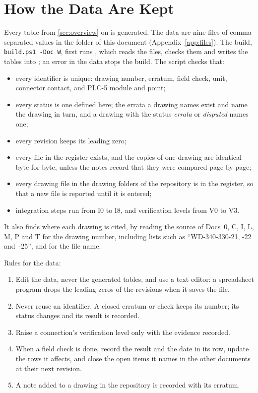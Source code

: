 \section{How the Data Are Kept}\label{sec:data}

Every table from \cref{sec:overview} on is generated. The data are nine files of
comma-separated values in the folder  of this document
(Appendix~\ref{app:files}). The build, \texttt{build.ps1 -Doc W}, first runs
, which reads the files, checks them and writes the tables
into ; an error in the data stops the build. The script checks that:
\begin{itemize}
\item every identifier is unique: drawing number, erratum, field check, unit,
  connector contact, and PLC-5 module and point;
\item every status is one defined here; the errata a drawing names exist and name
  the drawing in turn, and a drawing with the status \emph{errata} or \emph{disputed}
  names one;
\item every revision keeps its leading zero;
\item every file in the register exists, and the copies of one drawing are identical
  byte for byte, unless the notes record that they were compared page by page;
\item every drawing file in the drawing folders of the repository is in the register,
  so that a new file is reported until it is entered;
\item integration steps run from I0 to I8, and verification levels from V0 to V3.
\end{itemize}
It also finds where each drawing is cited, by reading the source of Docs~0, C, I, L,
M, P and T for the drawing number, including lists such as ``WD-340-330-21, -22
and~-25'', and for the file name.

Rules for the data:
\begin{enumerate}
\item Edit the data, never the generated tables, and use a text editor: a spreadsheet
  program drops the leading zeros of the revisions when it saves the file.
\item Never reuse an identifier. A closed erratum or check keeps its number; its status
  changes and its result is recorded.
\item Raise a connection's verification level only with the evidence recorded.
\item When a field check is done, record the result and the date in its row, update
  the rows it affects, and close the open items it names in the other documents at
  their next revision.
\item A note added to a drawing in the repository is recorded with its erratum.
\end{enumerate}

